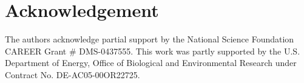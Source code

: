 
\section*{Acknowledgement}

The authors acknowledge partial support by the National Science Foundation
CAREER Grant \# DMS-0437555.
This work was partly supported by the U.S. Department of Energy,
Office of Biological and Environmental Research
under Contract No. DE-AC05-00OR22725.
\\
